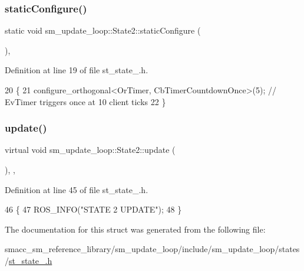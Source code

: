 \subsubsection{\texorpdfstring{static\+Configure()}{staticConfigure()}}
{\footnotesize\ttfamily static void sm\+\_\+update\+\_\+loop\+::\+State2\+::static\+Configure (\begin{DoxyParamCaption}{ }\end{DoxyParamCaption})\hspace{0.3cm}{\ttfamily [inline]}, {\ttfamily [static]}}



Definition at line 19 of file st\+\_\+state\+\_.\+h.


\begin{DoxyCode}
20     \{
21         configure\_orthogonal<OrTimer, CbTimerCountdownOnce>(5); \textcolor{comment}{// EvTimer triggers once at 10 client ticks}
22     \}
\end{DoxyCode}
\mbox{\label{structsm__update__loop_1_1State2_aab947246406d3225de2f83f336ae24a3}} 
\subsubsection{\texorpdfstring{update()}{update()}}
{\footnotesize\ttfamily virtual void sm\+\_\+update\+\_\+loop\+::\+State2\+::update (\begin{DoxyParamCaption}{ }\end{DoxyParamCaption})\hspace{0.3cm}{\ttfamily [inline]}, {\ttfamily [override]}, {\ttfamily [virtual]}}



Definition at line 45 of file st\+\_\+state\+\_.\+h.


\begin{DoxyCode}
46     \{
47         ROS\_INFO(\textcolor{stringliteral}{"STATE 2 UPDATE"});
48     \}
\end{DoxyCode}


The documentation for this struct was generated from the following file\+:\begin{DoxyCompactItemize}
\item 
smacc\+\_\+sm\+\_\+reference\+\_\+library/sm\+\_\+update\+\_\+loop/include/sm\+\_\+update\+\_\+loop/states/\hyperlink{smacc__sm__reference__library_2sm__update__loop_2include_2sm__update__loop_2states_2st__state__2_8h}{st\+\_\+state\+\_.\+h}\end{DoxyCompactItemize}
